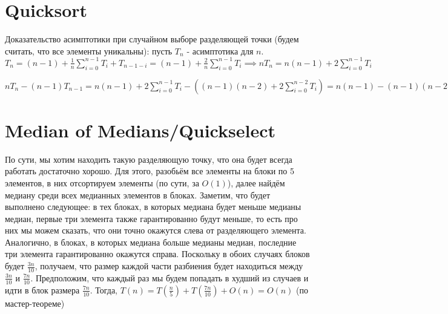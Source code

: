 \documentclass{article}
\begin{document}

\section{Quicksort}

Доказательство асимптотики при случайном выборе разделяющей точки (будем считать, что все элементы уникальны): пусть $T_n$ - асимптотика для $n$. $T_n = (n - 1) + \frac{1}{n} \sum \limits_{i=0}^{n-1} T_i + T_{n-1-i} = (n - 1) + \frac{2}{n} \sum \limits_{i=0}^{n-1} T_i \implies nT_n = n(n - 1) + 2 \sum \limits_{i=0}^{n-1} T_i$

$nT_n - (n-1)T_{n-1} = n(n - 1) + 2 \sum \limits_{i=0}^{n-1} T_i - ((n - 1)(n - 2) + 2 \sum \limits_{i=0}^{n-2} T_i) = n(n-1) - (n-1)(n-2) + 2T_{n-1} \implies nT_n = (n+1)T_{n-1} + 2n - 2 \implies \frac{T_n}{n+1} = \frac{T_{n-1}}{n} + \frac{2}{n+1} - \frac{2}{n(n+1)} \leq \frac{T_{n-1}}{n} + \frac{2}{n+1} = \frac{T_{n-2}}{n-1} + \frac{2}{n+1} + \frac{2}{n} - \frac{2}{n(n-1)} \leq \dots \leq \frac{T_1}{2} + \sum \limits_{i=1}^{n+1} \frac{2}{i} = O(n \log n)$

\section{Median of Medians/Quickselect}

По сути, мы хотим находить такую разделяющую точку, что она будет всегда работать достаточно хорошо. Для этого, разобьём все элементы на блоки по 5 элементов, в них отсортируем элементы (по сути, за $O(1)$), далее найдём медиану среди всех медианных элементов в блоках. Заметим, что будет выполнено следующее: в тех блоках, в которых медиана будет меньше медианы медиан, первые три элемента также гарантированно будут меньше, то есть про них мы можем сказать, что они точно окажутся слева от разделяющего элемента. Аналогично, в блоках, в которых медиана больше медианы медиан, последние три элемента гарантированно окажутся справа. Поскольку в обоих случаях блоков будет $\frac{3n}{10}$, получаем, что размер каждой части разбиения будет находиться между $\frac{3n}{10}$ и $\frac{7n}{10}$. Предположим, что каждый раз мы будем попадать в худший из случаев и идти в блок размера $\frac{7n}{10}$. Тогда, $T(n) = T(\frac{n}{5}) + T(\frac{7n}{10}) + O(n) = O(n)$ (по мастер-теореме)
\end{document}
